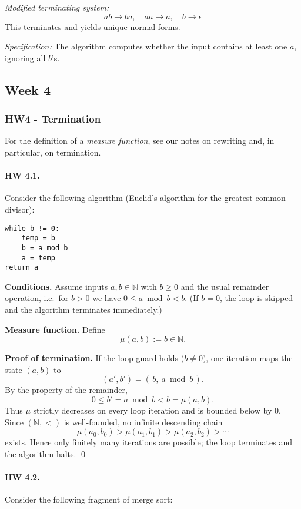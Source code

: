 \documentclass{article}
\theoremstyle{theorem}
\theoremstyle{definition}
\theoremstyle{remark}
\begin{document}
\textit{Modified terminating system:}
\[
ab \to ba, \quad aa \to a, \quad b \to \epsilon
\]
This terminates and yields unique normal forms.  

\textit{Specification:} The algorithm computes whether the input contains at least one $a$, ignoring all $b$’s.

\subsection{Week 4}
\subsubsection{HW4 - Termination}

For the definition of a \emph{measure function}, see our notes on rewriting and, in particular, on termination.

\paragraph{HW 4.1.}
Consider the following algorithm (Euclid’s algorithm for the greatest common divisor):

\begin{verbatim}
while b != 0:
    temp = b
    b = a mod b
    a = temp
return a
\end{verbatim}

\textbf{Conditions.} Assume inputs $a,b \in \mathbb{N}$ with $b \geq 0$ and the usual remainder operation, i.e.\ for $b>0$ we have $0 \leq a \bmod b < b$. (If $b=0$, the loop is skipped and the algorithm terminates immediately.)

\textbf{Measure function.} Define
\[
\mu(a,b) := b \in \mathbb{N}.
\]

\textbf{Proof of termination.}  
If the loop guard holds ($b \neq 0$), one iteration maps the state $(a,b)$ to
\[
(a',b') = (\,b,\ a \bmod b\,).
\]
By the property of the remainder,
\[
0 \leq b' = a \bmod b < b = \mu(a,b).
\]
Thus $\mu$ strictly decreases on every loop iteration and is bounded below by $0$.  
Since $(\mathbb{N},<)$ is well-founded, no infinite descending chain
\[
\mu(a_0,b_0) > \mu(a_1,b_1) > \mu(a_2,b_2) > \cdots
\]
exists. Hence only finitely many iterations are possible; the loop terminates and the algorithm halts. \qed

\medskip

\paragraph{HW 4.2.}
Consider the following fragment of merge sort:
\end{document}
